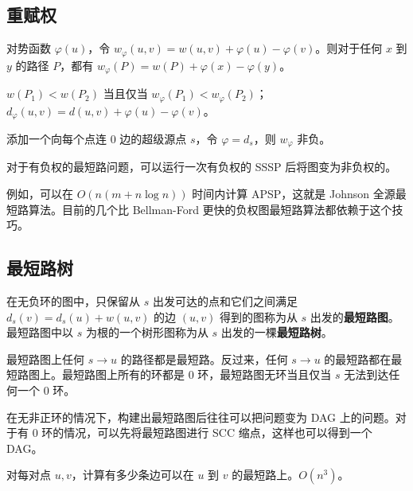 \subsection{重赋权}

\begin{lemma}
    对势函数 $\varphi(u)$，令 $w_{\varphi}(u,v)=w(u,v)+\varphi(u)-\varphi(v)$。则对于任何 $x$ 到 $y$ 的路径 $P$，都有 $w_{\varphi}(P)=w(P)+\varphi(x)-\varphi(y)$。
\end{lemma}
\begin{corollary}
    $w(P_1)<w(P_2)$ 当且仅当 $w_{\varphi}(P_1)<w_{\varphi}(P_2)$；$d_{\varphi}(u,v)=d(u,v)+\varphi(u)-\varphi(v)$。
\end{corollary}

\begin{lemma}
    添加一个向每个点连 $0$ 边的超级源点 $s$，令 $\varphi=d_s$，则 $w_{\varphi}$ 非负。
\end{lemma}
\begin{corollary}
    对于有负权的最短路问题，可以运行一次有负权的 SSSP 后将图变为非负权的。
\end{corollary}
\begin{remark}
    例如，可以在 $O(n(m+n\log n))$ 时间内计算 APSP，这就是 Johnson 全源最短路算法。目前的几个比 Bellman-Ford 更快的负权图最短路算法都依赖于这个技巧。
\end{remark}

\subsection{最短路树}

\begin{definition}[最短路图与最短路树]
    在无负环的图中，只保留从 $s$ 出发可达的点和它们之间满足 $d_s(v)=d_s(u)+w(u,v)$ 的边 $(u,v)$ 得到的图称为从 $s$ 出发的\textbf{最短路图}。最短路图中以 $s$ 为根的一个树形图称为从 $s$ 出发的一棵\textbf{最短路树}。
\end{definition}
\begin{lemma}
    最短路图上任何 $s\to u$ 的路径都是最短路。反过来，任何 $s\to u$ 的最短路都在最短路图上。最短路图上所有的环都是 $0$ 环，最短路图无环当且仅当 $s$ 无法到达任何一个 $0$ 环。
\end{lemma}

在无非正环的情况下，构建出最短路图后往往可以把问题变为 DAG 上的问题。对于有 $0$ 环的情况，可以先将最短路图进行 SCC 缩点，这样也可以得到一个 DAG。

\begin{exercise}
    对每对点 $u,v$，计算有多少条边可以在 $u$ 到 $v$ 的最短路上。$O(n^3)$。
\end{exercise}

